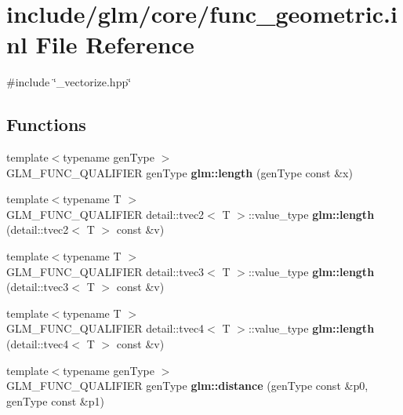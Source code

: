 \hypertarget{func__geometric_8inl}{\section{include/glm/core/func\-\_\-geometric.inl \-File \-Reference}
\label{func__geometric_8inl}
}
{\ttfamily \#include \char`\"{}\-\_\-vectorize.\-hpp\char`\"{}}\*
\subsection*{\-Functions}
\begin{DoxyCompactItemize}
\item 
\hypertarget{namespaceglm_a7a218f95a58b806b818c36f9ec2774b6}{{\footnotesize template$<$typename gen\-Type $>$ }\\\-G\-L\-M\-\_\-\-F\-U\-N\-C\-\_\-\-Q\-U\-A\-L\-I\-F\-I\-E\-R gen\-Type {\bfseries glm\-::length} (gen\-Type const \&x)}\label{namespaceglm_a7a218f95a58b806b818c36f9ec2774b6}

\item 
\hypertarget{namespaceglm_a9b274882b38ddb0bd507c845e41e7cb5}{{\footnotesize template$<$typename T $>$ }\\\-G\-L\-M\-\_\-\-F\-U\-N\-C\-\_\-\-Q\-U\-A\-L\-I\-F\-I\-E\-R \*
detail\-::tvec2$<$ \-T $>$\-::value\-\_\-type {\bfseries glm\-::length} (detail\-::tvec2$<$ \-T $>$ const \&v)}\label{namespaceglm_a9b274882b38ddb0bd507c845e41e7cb5}

\item 
\hypertarget{namespaceglm_a191bf91c699b38f4b7807e23fd809e97}{{\footnotesize template$<$typename T $>$ }\\\-G\-L\-M\-\_\-\-F\-U\-N\-C\-\_\-\-Q\-U\-A\-L\-I\-F\-I\-E\-R \*
detail\-::tvec3$<$ \-T $>$\-::value\-\_\-type {\bfseries glm\-::length} (detail\-::tvec3$<$ \-T $>$ const \&v)}\label{namespaceglm_a191bf91c699b38f4b7807e23fd809e97}

\item 
\hypertarget{namespaceglm_a0668efb90859b9cb66f31889cdf04aef}{{\footnotesize template$<$typename T $>$ }\\\-G\-L\-M\-\_\-\-F\-U\-N\-C\-\_\-\-Q\-U\-A\-L\-I\-F\-I\-E\-R \*
detail\-::tvec4$<$ \-T $>$\-::value\-\_\-type {\bfseries glm\-::length} (detail\-::tvec4$<$ \-T $>$ const \&v)}\label{namespaceglm_a0668efb90859b9cb66f31889cdf04aef}

\item 
\hypertarget{namespaceglm_aa7275be4cec4bfcf1c4a7add8f3ee7f4}{{\footnotesize template$<$typename gen\-Type $>$ }\\\-G\-L\-M\-\_\-\-F\-U\-N\-C\-\_\-\-Q\-U\-A\-L\-I\-F\-I\-E\-R gen\-Type {\bfseries glm\-::distance} (gen\-Type const \&p0, gen\-Type const \&p1)}\label{namespaceglm_aa7275be4cec4bfcf1c4a7add8f3ee7f4}


\end{DoxyCompactItemize}
